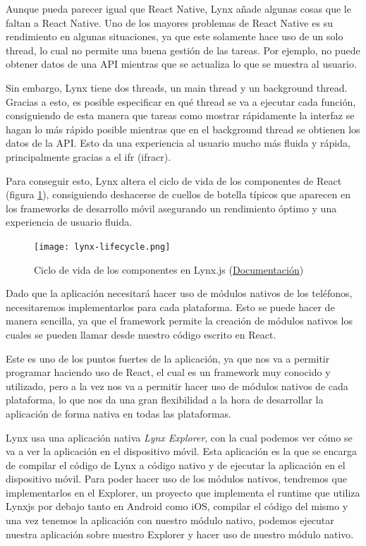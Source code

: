 Aunque pueda parecer igual que React Native, Lynx añade algunas cosas que le faltan a React Native. Uno de los mayores problemas de React Native es su rendimiento en algunas situaciones, ya que este solamente hace uso de un solo thread, lo cual no permite una buena gestión de las tareas. Por ejemplo, no puede obtener datos de una API mientras que se actualiza lo que se muestra al usuario.

Sin embargo, Lynx tiene dos threads, un main thread y un background thread.
Gracias a esto, es posible especificar en qué thread se va a ejecutar cada función, consiguiendo de esta manera que tareas como mostrar rápidamente la interfaz se hagan lo más rápido posible mientras que en el background thread se obtienen los datos de la API.
Esto da una experiencia al usuario mucho más fluida y rápida, principalmente gracias a el \gls{ifr} (\acrshort{ifracr}).

Para conseguir esto, Lynx altera el ciclo de vida de los componentes de React (figura \ref{fig:lynx-component-lifecycle}), consiguiendo deshacerse de cuellos de botella típicos que aparecen en los frameworks de desarrollo móvil asegurando un rendimiento óptimo y una experiencia de usuario fluida.

\begin{figure}[h]
    \begin{center}
        \texttt{[image: lynx-lifecycle.png]}
    \end{center}
    \caption{Ciclo de vida de los componentes en Lynx.js (\href{https://lynxjs.org/react/lifecycle.html}{Documentación})}
    \label{fig:lynx-component-lifecycle}
\end{figure}


Dado que la aplicación necesitará hacer uso de módulos nativos de los teléfonos, necesitaremos implementarlos para cada plataforma.
Esto se puede hacer de manera sencilla, ya que el framework permite la creación de módulos nativos los cuales se pueden llamar desde nuestro código escrito en React.

Este es uno de los puntos fuertes de la aplicación, ya que nos va a permitir programar haciendo uso de React, el cual es un framework muy conocido y utilizado, pero a la vez nos va a permitir hacer uso de módulos nativos de cada plataforma, lo que nos da una gran flexibilidad a la hora de desarrollar la aplicación de forma nativa en todas las plataformas.

Lynx usa una aplicación nativa \textit{Lynx Explorer}, con la cual podemos ver cómo se va a ver la aplicación en el dispositivo móvil. Esta aplicación es la que se encarga de compilar el código de Lynx a código nativo y de ejecutar la aplicación en el dispositivo móvil.
Para poder hacer uso de los módulos nativos, tendremos que implementarlos en el Explorer, un proyecto que implementa el runtime que utiliza Lynxjs por debajo tanto en Android como iOS, compilar el código del mismo y una vez tenemos la aplicación con nuestro módulo nativo, podemos ejecutar nuestra aplicación sobre nuestro Explorer y hacer uso de nuestro módulo nativo.

